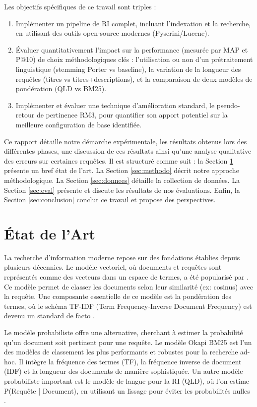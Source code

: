 \documentclass[11pt,a4paper]{article}
\begin{document}
Les objectifs spécifiques de ce travail sont triples :
\begin{enumerate}
    \item Implémenter un pipeline de RI complet, incluant l'indexation et la recherche, en utilisant des outils open-source modernes (Pyserini/Lucene).
    \item Évaluer quantitativement l'impact sur la performance (mesurée par MAP et P@10) de choix méthodologiques clés : l'utilisation ou non d'un prétraitement linguistique (stemming Porter vs baseline), la variation de la longueur des requêtes (titres vs titres+descriptions), et la comparaison de deux modèles de pondération (QLD vs BM25).
    \item Implémenter et évaluer une technique d'amélioration standard, le pseudo-retour de pertinence RM3, pour quantifier son apport potentiel sur la meilleure configuration de base identifiée.
\end{enumerate}
Ce rapport détaille notre démarche expérimentale, les résultats obtenus lors des différentes phases, une discussion de ces résultats ainsi qu'une analyse qualitative des erreurs sur certaines requêtes. Il est structuré comme suit : la Section \ref{sec:etat_art} présente un bref état de l'art. La Section \ref{sec:methodo} décrit notre approche méthodologique. La Section \ref{sec:donnees} détaille la collection de données. La Section \ref{sec:eval} présente et discute les résultats de nos évaluations. Enfin, la Section \ref{sec:conclusion} conclut ce travail et propose des perspectives.
\clearpage
\section{État de l'Art}
\label{sec:etat_art}
La recherche d'information moderne repose sur des fondations établies depuis plusieurs décennies. Le modèle vectoriel, où documents et requêtes sont représentés comme des vecteurs dans un espace de termes, a été popularisé par \citet{Salton1988TermWeighting}. Ce modèle permet de classer les documents selon leur similarité (ex: cosinus) avec la requête. Une composante essentielle de ce modèle est la pondération des termes, où le schéma TF-IDF (Term Frequency-Inverse Document Frequency) est devenu un standard de facto \citep{Salton1988TermWeighting}.

Le modèle probabiliste offre une alternative, cherchant à estimer la probabilité qu'un document soit pertinent pour une requête. Le modèle Okapi BM25 \citep{Robertson1995Okapi} est l'un des modèles de classement les plus performants et robustes pour la recherche ad-hoc. Il intègre la fréquence des termes (TF), la fréquence inverse de document (IDF) et la longueur des documents de manière sophistiquée. Un autre modèle probabiliste important est le modèle de langue pour la RI (QLD), où l'on estime P(Requête | Document), en utilisant un lissage pour éviter les probabilités nulles \citep{Manning2008IRBook}. %
\end{document}
